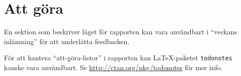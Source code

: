 

\section*{Att göra}
En sektion som beskriver läget för rapporten kan vara användbart i ``veckans inlämning'' för att underlätta feedbacken.

För att hantera ``att-göra-listor'' i rapporten kan La\TeX-paketet \verb|todonotes| kanske vara användbart. Se \url{http://ctan.org/pkg/todonotes} för mer info.



